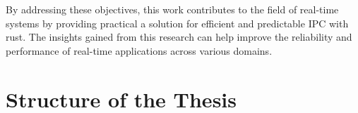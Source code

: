 By addressing these objectives, this work contributes to the field of real-time systems by providing practical a solution for efficient and predictable \ac{IPC} with rust. The insights gained from this research can help improve the reliability and performance of real-time applications across various domains.

\section{Structure of the Thesis}
